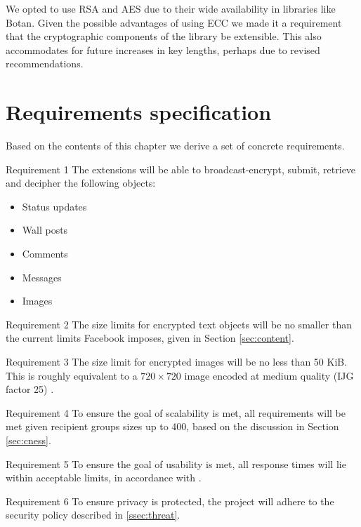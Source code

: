 We opted to use RSA and AES due to their wide availability in libraries like Botan. Given the possible advantages of using ECC we made it a requirement that the cryptographic components of the library be extensible. This also accommodates for future increases in key lengths, perhaps due to revised recommendations. 


\FloatBarrier
\section{Requirements specification}
\label{sec:req}

Based on the contents of this chapter we derive a set of concrete requirements.
        
\begin{desc}

    \item[Requirement 1] The extensions will be able to broadcast-encrypt, submit, retrieve and decipher the following objects:
    
    \begin{itemize}
        \item Status updates
        \item Wall posts
        \item Comments
        \item Messages
        \item Images
    \end{itemize}
    
    \item[Requirement 2] The size limits for encrypted text objects will be no smaller than the current limits Facebook imposes, given in Section \ref{sec:content}.

    \item[Requirement 3] The size limit for encrypted images will be no less than 50 KiB. This is roughly equivalent to a $720 \times 720$ image encoded at medium quality (IJG factor 25) \cite{ijg}.

    \item[Requirement 4] To ensure the goal of scalability is met, all requirements will be met given recipient groups sizes up to 400, based on the discussion in Section \ref{sec:cness}.
    
    
    \item[Requirement 5] To ensure the goal of usability is met, all response times will lie within acceptable limits, in accordance with \cite{response}.


    \item[Requirement 6] To ensure privacy is protected, the project will adhere to the security policy described in \ref{ssec:threat}.



\end{desc}
